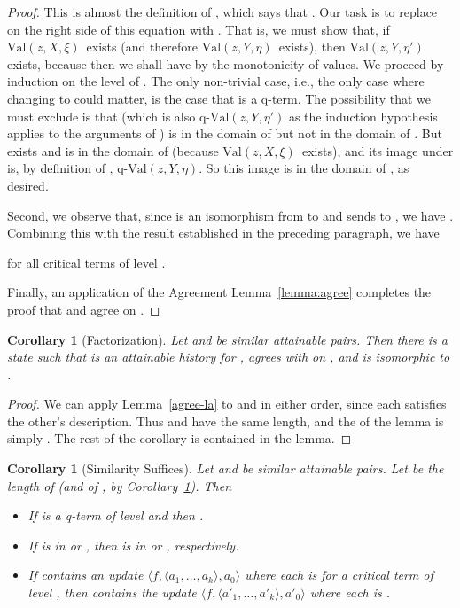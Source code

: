 \documentclass{LMCS}
\newtheorem{coro}[thm]{Corollary}
\theoremstyle{definition}
\newenvironment{ls}{\begin{itemize}}{\end{itemize}}
\newcommand{\qval}[3]{\ensuremath{\text{q-Val}(#1,#2,#3)}}
\newcommand{\sq}[1]{\ensuremath{\langle#1\rangle}}
\newcommand{\val}[3]{\ensuremath{\text{Val}(#1,#2,#3)}}
\begin{document}
\begin{proof}
This is almost the definition of , which says that .  Our task is to replace  on the right
side of this equation with .  That is, we must show that,
if \val zX\xi\ exists (and therefore \val zY\eta\ exists), then
\val zY{\eta'} exists, because then we shall have  by the monotonicity of values.  We proceed
by induction on the level of .
The only non-trivial case, i.e., the only case where changing
 to  could matter, is the case that  is a q-term.
The possibility that we must exclude is that  (which
is also \qval zY{\eta'} as the induction hypothesis applies to the
arguments of ) is in the domain of  but not in the domain
of . But  exists and is in the domain of 
(because \val zX\xi\ exists), and its image under  is, by
definition of , \qval zY\eta.  So this image is in the domain
of , as desired.

Second, we observe that, since  is an isomorphism from  to 
and sends  to , we have .
Combining this with the result established in the preceding paragraph,
we have

for all critical terms  of level .

Finally, an application of the Agreement Lemma~\ref{lemma:agree}
completes the proof that  and  agree on .
\end{proof}

\begin{coro}[Factorization]    \label{agree-cor}
Let  and  be similar attainable pairs.   Then
there is a state  such that  is an attainable history for
,  agrees with  on , and  is
isomorphic to .
\end{coro}

\begin{proof}
We can apply Lemma~\ref{agree-la} to  and  in
either order, since each satisfies the other's description.  Thus
 and  have the same length, and the  of the lemma is
simply .  The rest of the corollary is contained in the lemma.
\end{proof}

\begin{coro}[Similarity Suffices]    \label{descr-suff}
Let  and  be similar attainable pairs.   Let
 be the length of  (and of , by
Corollary~\ref{agree-cor}). Then
\begin{ls}
\item If  is a q-term of level  and 
  then .
\item If  is in  or , then  is in
   or , respectively.
\item If  contains an update \sq{f,\sq{a_1,\dots,a_k},a_0}
  where each  is  for a critical term  of level , then  contains the update
  \sq{f,\sq{a'_1,\dots,a'_k},a'_0} where each  is
  .
\end{ls}
\end{coro}
\end{document}
